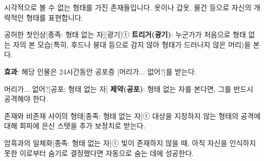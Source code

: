 \documentclass{report}
\begin{document}
	시각적으로 볼 수 없는 형태를 가진 존재들입니다. 옷이나 갑옷, 물건 등으로 자신의 개략적인 형태를 표현합니다.
	
	\begin{story}{공허한 첫인상}{[종족: 형태 없는 자][광기]ⓣ}
		\textbf{트리거(광기)}: 누군가가 처음으로 형태 없는 자의 본 모습(특히, 후드나 붕대 등으로 감지 않아 형태가 드러나지 않은 머리)을 본다.
		
		\textbf{효과}: 해당 인물은 24시간동안 공포증 [머리가... 없어?]를 받는다.
		
	\end{story}
	
	\begin{story}{머리가... 없어?}{[공포: 형태 없는 자]}
		\textbf{제약(공포)}: 형태 없는 자를 본다면, 그를 반드시 공격해야 한다.
		
	\end{story}
	
	\begin{story}{존재와 비존재 사이의 형태}{[종족: 형태 없는 자]ⓣ}
		대상을 지정하지 않는 형태의 공격에 대해 회피에 은신 스탯을 추가 보정치로 받는다.
		
	\end{story}
	
	\begin{story}{암흑과의 일체화}{[종족: 형태 없는 자]ⓣ}
		빛이 존재하지 않을 때, 아직 자신을 인식하지 못한 이로부터 숨기로 결정했다면 자동으로 숨는 데에 성공한다.
		
	\end{story}
\end{document}
